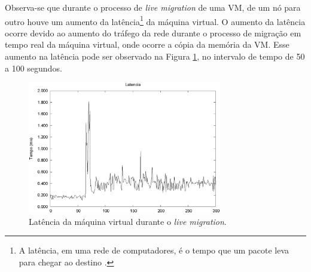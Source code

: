 % 

Observa-se que durante o processo de \textit{live migration} de uma \ac{VM}, de um nó para outro houve um aumento da latência\footnote[1]{
A latência, em uma rede de computadores, é o tempo que um pacote leva para chegar ao destino \cite{geordano2014}.} da máquina virtual.
O aumento da latência ocorre devido ao aumento do tráfego da rede durante o processo de migração em tempo real da máquina virtual, 
onde ocorre a cópia da memória da \ac{VM}.
Esse aumento na latência pode ser observado na Figura \ref{fig:teste2_latencia}, no intervalo de tempo de 50 a 100 segundos.



\begin{figure}[h!]
 \centering
 \includegraphics[width=320px]{img/teste2_latencia.eps}
 \caption{Latência da máquina virtual durante o \textit{live migration}.}
 \label{fig:teste2_latencia}
\end{figure}

